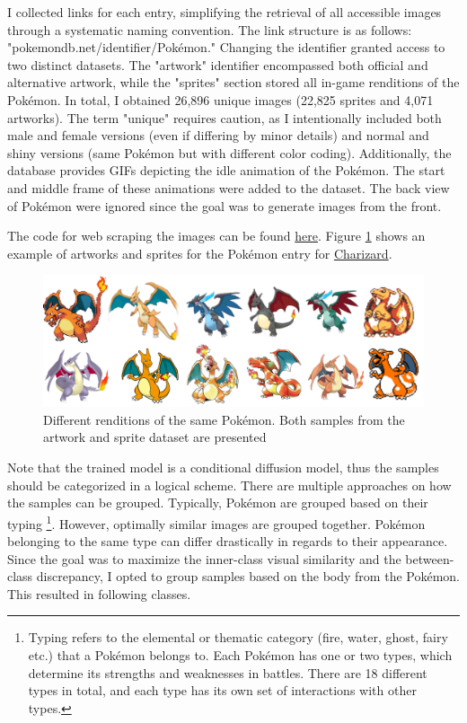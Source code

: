\documentclass[12pt]{article}
\theoremstyle{plain}
\theoremstyle{definition}
\theoremstyle{remark}
\begin{document}
I collected links for each entry, simplifying the retrieval of all accessible images through a systematic naming convention. The link structure is as follows: "pokemondb.net/identifier/Pokémon." Changing the identifier granted access to two distinct datasets. The "artwork" identifier encompassed both official and alternative artwork, while the "sprites" section stored all in-game renditions of the Pokémon. In total, I obtained 26,896 unique images (22,825 sprites and 4,071 artworks). The term "unique" requires caution, as I intentionally included both male and female versions (even if differing by minor details) and normal and shiny versions (same Pokémon but with different color coding). Additionally, the database provides GIFs depicting the idle animation of the Pokémon. The start and middle frame of these animations were added to the dataset. The back view of Pokémon were ignored since the goal was to generate images from the front. 

The code for web scraping the images can be found \href{https://github.com/mhueppe/Diffusion_Models/tree/master/preprocessing}{here}. Figure \ref{fig:variouscharizard} shows an example of artworks and sprites for the Pokémon entry for \href{https://pokemondb.net/pokedex/charizard}{Charizard}.

\begin{figure}[h]
	\centering
	\includegraphics[width=\linewidth]{src/Images/various_charizard}
	\caption[Different Pokémon renditions]{Different renditions of the same Pokémon. Both samples from the artwork and sprite dataset are presented}
	\label{fig:variouscharizard}
\end{figure}

Note that the trained model is a conditional diffusion model, thus the samples should be categorized in a logical scheme.  There are multiple approaches on how the samples can be grouped. Typically, Pokémon are grouped based on their typing \footnote{Typing refers to the elemental or thematic category (fire, water, ghost, fairy etc.) that a Pokémon belongs to. Each Pokémon has one or two types, which determine its strengths and weaknesses in battles. There are 18 different types in total, and each type has its own set of interactions with other types.}. However, optimally similar images are grouped together. Pokémon belonging to the same type can differ drastically in regards to their appearance. Since the goal was to maximize the inner-class visual similarity and the between-class discrepancy, I opted to group samples based on the body from the Pokémon. 
This resulted in following classes.\\
\end{document}
